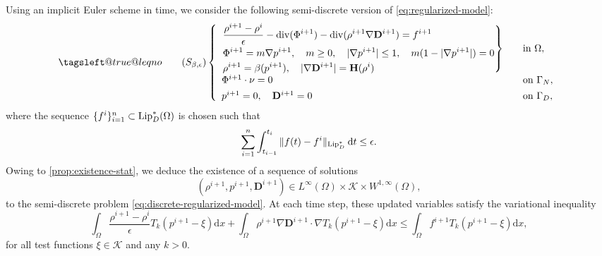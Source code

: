 \documentclass[final,reqno]{amsart}
\makeatletter
\theoremstyle{plain}
\theoremstyle{definition}
\theoremstyle{remark}
\numberwithin{remark}{section}	%
\numberwithin{example}{section}	%
\DeclareMathOperator{\dive}{div}
\newcommand{\de}{\mathbf{D}}
\newcommand{\he}{\mathbf{H}}
\newcommand{\K}{\mathcal K}
\newcommand{\Om}{\Omega}
\newcommand{\Lip}{\textup{Lip}}
\newcommand{\dd}{\mathrm{d}}
\newcommand{\leqnomode}{\tagsleft@true\let\veqno\@@leqno}
\makeatother
\begin{document}
      
Using an implicit Euler scheme in time, we consider the following semi-discrete version of \eqref{eq:regularized-model}:
\begin{equation}\leqnomode
    \tag{$S_{\beta,\epsilon}$}
    \label{eq:discrete-regularized-model}
    \left\{
    \begin{array}{ll}
        \left. \begin{aligned}
            &\frac{\rho^{i+1}-\rho^{i}}{\epsilon} -\dive (\Phi^{i+1}) -\dive(\rho^{i+1} \nabla \de^{i+1}) = f^{i+1} \\
            &\Phi^{i+1}=m \nabla p^{i+1}, \quad m\geq0, \quad \vert \nabla p^{i+1}\vert \leq 1, \quad m(1-\vert \nabla p^{i+1}\vert)=0\\
            &\rho^{i+1}=\beta(p^{i+1}), \quad \vert \nabla \de^{i+1}\vert =\he(\rho^{i})
        \end{aligned} \right\} \quad & \text{in } \Omega, \\[4ex]
        \Phi^{i+1} \cdot \nu = 0 & \text{on } \Gamma_N, \\[1ex]
        p^{i+1} = 0, \quad \de^{i+1} = 0 & \text{on } \Gamma_D,
    \end{array}
    \right.
\end{equation}
where the sequence $\{f^i\}_{i=1}^n \subset \Lip_D^*(\Om)$ is chosen such that 	
\begin{equation}
    \sum_{i=1}^{n}\int_{t_{i-1}}^{t_{i}} \Vert f(t)-f^{i} \Vert_{\Lip_D^*} \: \dd t \le \epsilon.
\end{equation}	   
Owing to \cref{prop:existence-stat}, we deduce the existence of a sequence of solutions 
\[
(\rho^{i+1}, p^{i+1}, \de^{i+1}) \in L^{\infty}(\Om) \times \K \times W^{1,\infty}(\Om),
\]
to the semi-discrete problem \eqref{eq:discrete-regularized-model}. At each time step, these updated variables satisfy the variational inequality
\begin{equation}\label{eq:evol_i}
    \int_{\Omega} \frac{\rho^{i+1}-\rho^{i}}{\epsilon} T_k (p^{i+1}-\xi) \dd x + \int_{\Omega} \rho^{i+1} \nabla \de^{i+1} \cdot \nabla T_k(p^{i+1}-\xi) \dd x \le \int_{\Omega} f^{i+1} T_k(p^{i+1}-\xi) \dd x,
\end{equation}
for all test functions $\xi \in \K$ and any $k>0$.
\end{document}
